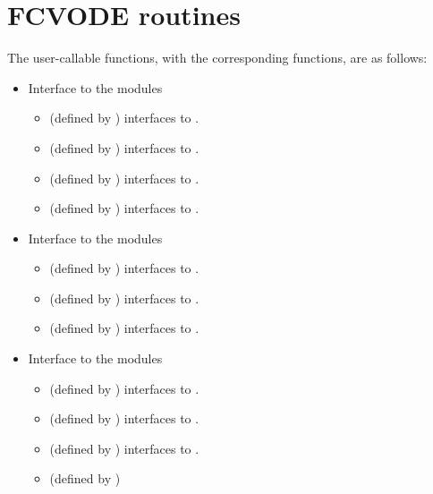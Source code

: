 \section{FCVODE routines}\label{sss:fcvroutines}

The user-callable functions, with the corresponding {\cvode} functions,
are as follows:
\begin{itemize}
\item
  Interface to the {\nvector} modules
  \begin{itemize}
  \item {} (defined by {\nvecs}) 
    interfaces to .
  \item {} (defined by {\nvecp}) 
    interfaces to .
  \item {} (defined by {\nvecopenmp}) 
    interfaces to .
  \item {} (defined by {\nvecpthreads}) 
    interfaces to .
  \end{itemize}
\item
  Interface to the {\sunmatrix} modules
  \begin{itemize}
  \item {} (defined by {\sunmatband}) 
    interfaces to .
  \item {} (defined by {\sunmatdense}) 
    interfaces to .
  \item {} (defined by {\sunmatsparse}) 
    interfaces to .
  \end{itemize}
\item
  Interface to the {\sunlinsol} modules
  \begin{itemize}
  \item {} (defined by {\sunlinsolband}) 
    interfaces to .
  \item {} (defined by {\sunlinsoldense}) 
    interfaces to .
  \item {} (defined by {\sunlinsolklu}) 
    interfaces to .
  \item {} (defined by {\sunlinsolklu}) 

\end{itemize}
\end{itemize}
